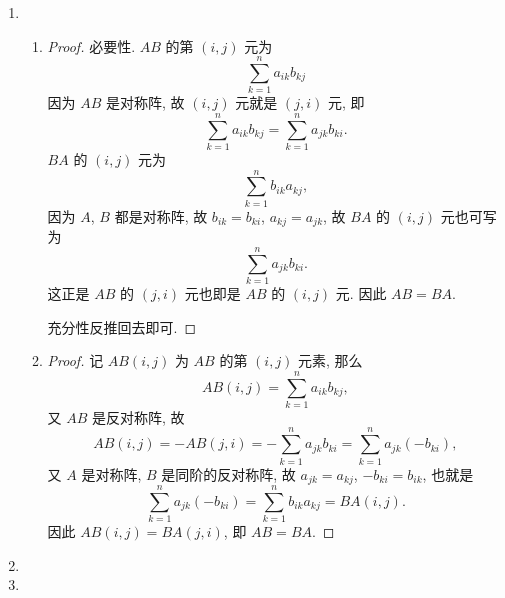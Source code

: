 \begin{enumerate}
\begin{enumerate}[(1)]
\[\begin{array}{cccc}
                            0 & x
                        \end{array}
                    \right).
                \]
                其中 $x, y \in \mathrm{R}$.
            \item %
                同 (1).
        \end{enumerate}
    \item %
        \begin{enumerate}[(1)]
            \item %
                \begin{proof}
                    必要性. $AB$ 的第 $(i, j)$ 元为
                    \[
                        \sum_{k=1}^n a_{ik}b_{kj}
                    \]
                    因为 $AB$ 是对称阵, 故 $(i, j)$ 元就是 $(j, i)$ 元, 即
                    \[
                        \sum_{k=1}^n a_{ik}b_{kj} = \sum_{k=1}^n a_{jk}b_{ki}.    
                    \]
                    $BA$ 的 $(i, j)$ 元为
                    \[
                        \sum_{k=1}^n b_{ik}a_{kj},    
                    \]
                    因为 $A$, $B$ 都是对称阵, 故 $b_{ik} = b_{ki}$, $a_{kj} = a_{jk}$, 故 $BA$ 的 $(i, j)$ 元也可写为
                    \[
                        \sum_{k=1}^n a_{jk}b_{ki}.   
                    \]
                    这正是 $AB$ 的 $(j, i)$ 元也即是 $AB$ 的 $(i, j)$ 元. 因此 $AB = BA$.
                    
                    充分性反推回去即可.
                \end{proof}
            \item %
                \begin{proof}
                    记 $AB(i, j)$ 为 $AB$ 的第 $(i, j)$ 元素, 那么
                    \[
                        AB(i, j) = \sum_{k=1}^n a_{ik}b_{kj},   
                    \]
                    又 $AB$ 是反对称阵, 故
                    \[
                        AB(i, j) = -AB(j, i) = -\sum_{k=1}^n a_{jk}b_{ki} = \sum_{k=1}^n a_{jk}(-b_{ki}),  
                    \]
                    又 $A$ 是对称阵, $B$ 是同阶的反对称阵, 故 $a_{jk} = a_{kj}$, $-b_{ki} = b_{ik}$, 也就是
                    \[
                        \sum_{k=1}^n a_{jk}(-b_{ki}) = \sum_{k=1}^n b_{ik}a_{kj} = BA(i, j).    
                    \]
                    因此 $AB(i, j) = BA(j, i)$, 即 $AB = BA$.
                \end{proof}
        \end{enumerate}
    \item %
    \item %
\end{enumerate}
% 
